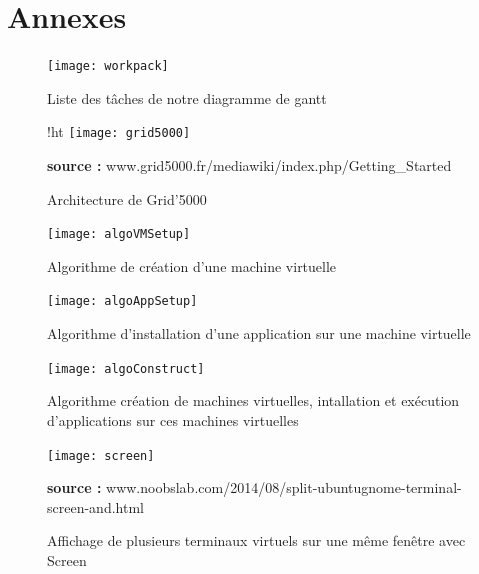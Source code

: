 \documentclass{report}
\begin{document}
\chapter*{Annexes}

    \begin{figure}[!ht]
        \centering{}\texttt{[image: workpack]}
        \caption{Liste des tâches de notre diagramme de gantt}
        \label{gantt}
    \end{figure}

    \begin{figure}{!ht}
        \centering{}\texttt{[image: grid5000]}
        \caption{Architecture de Grid'5000} 
        \label{grid5000}
        \hspace{\linewidth}
        \textbf{source : }www.grid5000.fr/mediawiki/index.php/Getting\_Started
    \end{figure}
    
    \begin{figure}[!ht]
        \centering{}\texttt{[image: algoVMSetup]}
        \caption{Algorithme de création d'une machine virtuelle} 
        \label{vmsetup}
    \end{figure}
    
    \begin{figure}[!ht]
        \centering{}\texttt{[image: algoAppSetup]}
        \caption{Algorithme d'installation d'une application sur une machine virtuelle} 
        \label{appsetup}
    \end{figure}
    
    \begin{figure}[!ht]
        \centering{}\texttt{[image: algoConstruct]}
        \caption{Algorithme création de machines virtuelles, intallation et exécution d'applications sur ces machines virtuelles} 
        \label{construct}
    \end{figure}
    
    \begin{figure}[!ht]
        \centering{}\texttt{[image: screen]}
        \caption{Affichage de plusieurs terminaux virtuels sur une même fenêtre avec Screen} 
        \label{screen}
        \hspace{\linewidth}
        \textbf{source : }www.noobslab.com/2014/08/split-ubuntugnome-terminal-screen-and.html
    \end{figure}
    
\end{document}
